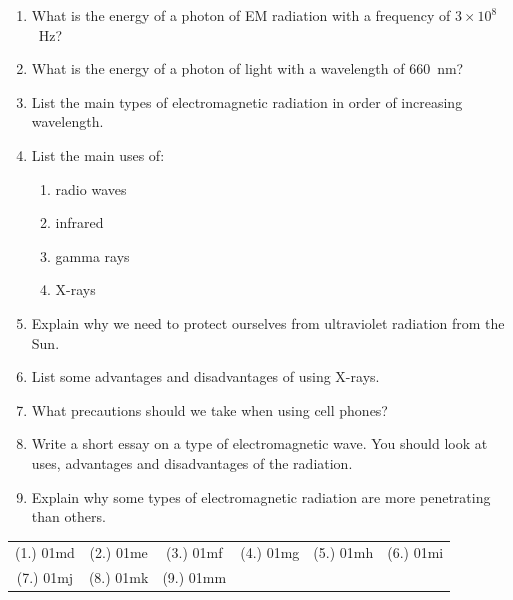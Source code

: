\begin{eocexercises}{}
\begin{enumerate}

\item What is the energy of a photon of EM radiation with a frequency of $3 \times 10^{8}$~Hz? 

\item What is the energy of a photon of light with a wavelength of 660~nm?

\item List the main types of electromagnetic radiation in order of increasing wavelength.

\item List the main uses of:
\begin{enumerate}
\item radio waves
\item infrared
\item gamma rays
\item X-rays
\end{enumerate}

\item Explain why we need to protect ourselves from ultraviolet radiation from the Sun.

\item List some advantages and disadvantages of using X-rays.

\item What precautions should we take when using cell phones?

\item Write a short essay on a type of electromagnetic wave. You should look at uses, advantages and disadvantages of the radiation.

\item Explain why some types of electromagnetic radiation are more penetrating than others.

\end{enumerate}

\par \practiceinfo
\par \begin{tabular}[h]{cccccc}
(1.)	01md	&
(2.)	01me	&
(3.)	01mf	&
(4.)	01mg	&
(5.)	01mh	&
(6.)	01mi	\\ %
(7.)	01mj	&
(8.)	01mk	&
(9.)	01mm	&
\end{tabular}

\end{eocexercises}







